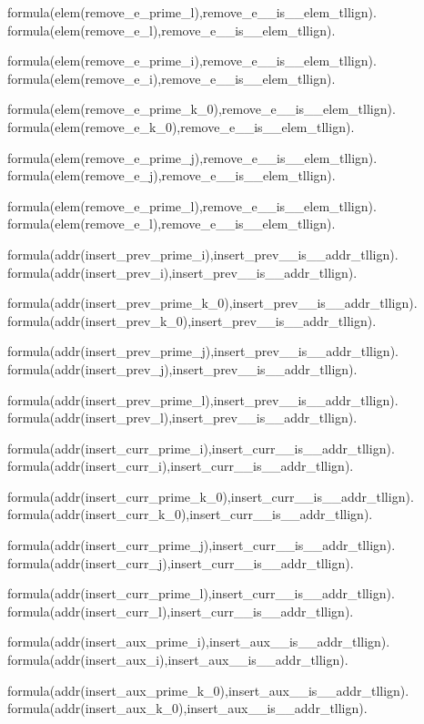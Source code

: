 formula(elem(remove\_e\_prime\_l),remove\_e\_\_is\_\_elem\_tllign).  formula(elem(remove\_e\_l),remove\_e\_\_is\_\_elem\_tllign).    

formula(elem(remove\_e\_prime\_i),remove\_e\_\_is\_\_elem\_tllign).  formula(elem(remove\_e\_i),remove\_e\_\_is\_\_elem\_tllign).    

formula(elem(remove\_e\_prime\_k\_0),remove\_e\_\_is\_\_elem\_tllign).    formula(elem(remove\_e\_k\_0),remove\_e\_\_is\_\_elem\_tllign).  

formula(elem(remove\_e\_prime\_j),remove\_e\_\_is\_\_elem\_tllign).  formula(elem(remove\_e\_j),remove\_e\_\_is\_\_elem\_tllign).    

formula(elem(remove\_e\_prime\_l),remove\_e\_\_is\_\_elem\_tllign).  formula(elem(remove\_e\_l),remove\_e\_\_is\_\_elem\_tllign).    

formula(addr(insert\_prev\_prime\_i),insert\_prev\_\_is\_\_addr\_tllign).    formula(addr(insert\_prev\_i),insert\_prev\_\_is\_\_addr\_tllign).  

formula(addr(insert\_prev\_prime\_k\_0),insert\_prev\_\_is\_\_addr\_tllign).  formula(addr(insert\_prev\_k\_0),insert\_prev\_\_is\_\_addr\_tllign).    

formula(addr(insert\_prev\_prime\_j),insert\_prev\_\_is\_\_addr\_tllign).    formula(addr(insert\_prev\_j),insert\_prev\_\_is\_\_addr\_tllign).  

formula(addr(insert\_prev\_prime\_l),insert\_prev\_\_is\_\_addr\_tllign).    formula(addr(insert\_prev\_l),insert\_prev\_\_is\_\_addr\_tllign).  

formula(addr(insert\_curr\_prime\_i),insert\_curr\_\_is\_\_addr\_tllign).    formula(addr(insert\_curr\_i),insert\_curr\_\_is\_\_addr\_tllign).  

formula(addr(insert\_curr\_prime\_k\_0),insert\_curr\_\_is\_\_addr\_tllign).  formula(addr(insert\_curr\_k\_0),insert\_curr\_\_is\_\_addr\_tllign).    

formula(addr(insert\_curr\_prime\_j),insert\_curr\_\_is\_\_addr\_tllign).    formula(addr(insert\_curr\_j),insert\_curr\_\_is\_\_addr\_tllign).  

formula(addr(insert\_curr\_prime\_l),insert\_curr\_\_is\_\_addr\_tllign).    formula(addr(insert\_curr\_l),insert\_curr\_\_is\_\_addr\_tllign).  

formula(addr(insert\_aux\_prime\_i),insert\_aux\_\_is\_\_addr\_tllign).  formula(addr(insert\_aux\_i),insert\_aux\_\_is\_\_addr\_tllign).    

formula(addr(insert\_aux\_prime\_k\_0),insert\_aux\_\_is\_\_addr\_tllign).    formula(addr(insert\_aux\_k\_0),insert\_aux\_\_is\_\_addr\_tllign).  

